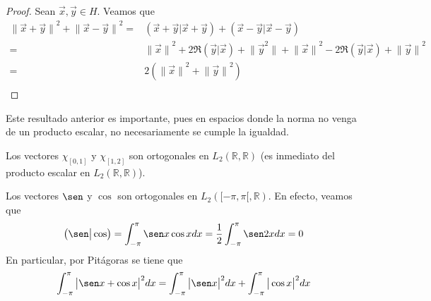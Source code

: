 \documentclass[12pt]{report}
\theoremstyle{largebreak}
\newcommand\abs[1]{\ensuremath{\big|#1\big|}}
\newcommand\norm[1]{\ensuremath{\|#1\|}}
\newcommand\pint[2]{\ensuremath{\left(#1\big| #2\right)}}
\begin{document}
    \begin{proof}
        Sean $\vec{x},\vec{y}\in H$. Veamos que
        \begin{equation*}
            \begin{split}
                \norm{\vec{x}+\vec{y}}^2+\norm{\vec{x}-\vec{y}}^2
                =&\pint{\vec{x}+\vec{y}}{\vec{x}+\vec{y}}+\pint{\vec{x}-\vec{y}}{\vec{x}-\vec{y}}\\
                =&\norm{\vec{x}}^2+2\Re\pint{\vec{y}}{\vec{x}}+\norm{\vec{y}^2}+\norm{\vec{x}}^2-2\Re\pint{\vec{y}}{\vec{x}}+\norm{\vec{y}}^2\\
                =&2(\norm{\vec{x}}^2+\norm{\vec{y}}^2)\\
            \end{split}
        \end{equation*}
    \end{proof}

    Este resultado anterior es importante, pues en espacios donde la norma no venga de un producto escalar, no necesariamente se cumple la igualdad.

    \begin{exa}
        Los vectores $\chi_{[0,1]}$ y $\chi_{[1,2]}$ son ortogonales en $L_2(\mathbb{R},\mathbb{R})$ (es inmediato del producto escalar en $L_2(\mathbb{R},\mathbb{R})$).
    \end{exa}

    \begin{exa}
        Los vectores $\sen$ y $\cos$ son ortogonales en $L_2([-\pi,\pi[,\mathbb{R})$. En efecto, veamos que
        \begin{equation*}
            \pint{\sen}{\cos}=\int_{-\pi}^{\pi}\sen x\cos xdx=\frac{1}{2}\int_{-\pi}^{\pi}\sen 2xdx=0
        \end{equation*}
        En particular, por Pitágoras se tiene que
        \begin{equation*}
            \int_{-\pi}^{\pi}\abs{\sen x+\cos x}^2dx=\int_{-\pi}^{\pi}\abs{\sen x}^2dx+\int_{-\pi}^{\pi}\abs{\cos x}^2dx
        \end{equation*}
    \end{exa}
\end{document}
